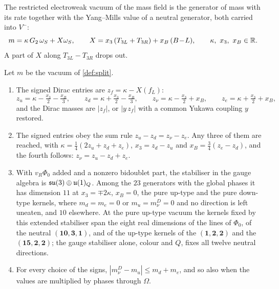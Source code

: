 \begin{definition}
\label{def:split}
The restricted electroweak vacuum of the mass field is the generator of mass with its rate together with the Yang--Mills value of a neutral
generator, both carried into $V^-$:
\[
m=\kappa\,G_2\,\omega_S+X\omega_S,\qquad X=x_3\,(T_{3L}+T_{3R})+x_B\,(B\!-\!L),\qquad \kappa,\ x_3,\ x_B\in\mathbb{R} .
\]
A part of $X$ along $T_{3L}-T_{3R}$ drops out.
\end{definition}

\begin{theorem}
\label{thm:split}
Let $m$ be the vacuum of \cref{def:split}.
\begin{enumerate}[label=(\roman*),leftmargin=2.2em,itemsep=1pt]
\item The signed Dirac entries are $z_f=\kappa-X(f_L)$:
\[
z_u=\kappa-\tfrac{x_3}2-\tfrac{x_B}3,\qquad z_d=\kappa+\tfrac{x_3}2-\tfrac{x_B}3,\qquad
z_\nu=\kappa-\tfrac{x_3}2+x_B,\qquad z_e=\kappa+\tfrac{x_3}2+x_B ,
\]
and the Dirac masses are $|z_f|$, or $|y\,z_f|$ with a common Yukawa coupling $y$ restored.
\item The signed entries obey the sum rule $z_u-z_d=z_\nu-z_e$. Any three of them are reached, with $\kappa=\tfrac14(2z_u+z_d+z_e)$,
$x_3=z_d-z_u$ and $x_B=\tfrac34(z_e-z_d)$, and the fourth follows: $z_\nu=z_u-z_d+z_e$.
\item With $v_R\Phi_0$ added and a nonzero bidoublet part, the stabiliser in the gauge algebra is $\mathfrak{su}(3)\oplus\mathfrak{u}(1)_Q$. Among the $23$
generators with the global phases it has dimension $11$ at $x_3=\mp2\kappa$, $x_B=0$, the pure up-type and the pure down-type kernels, where
$m_d=m_e=0$ or $m_u=m_\nu^D=0$ and no direction is left uneaten, and $10$ elsewhere. At the pure up-type vacuum the kernels fixed by this
extended stabiliser span the eight real dimensions of the lines of $\Phi_0$, of the neutral $(\mathbf{10},\mathbf3,\mathbf1)$, and of the
up-type kernels of the $(\mathbf1,\mathbf2,\mathbf2)$ and the $(\mathbf{15},\mathbf2,\mathbf2)$; the gauge stabiliser alone, colour and $Q$,
fixes all twelve neutral directions.
\item For every choice of the signs, $|m_\nu^D-m_u|\le m_d+m_e$, and so also when the values are multiplied by phases through $\Omega$.
\end{enumerate}
\end{theorem}

